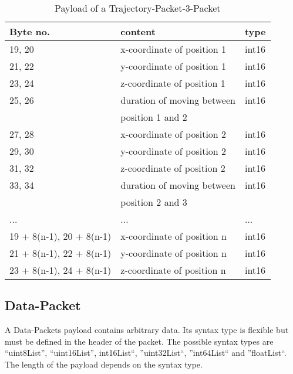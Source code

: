 \begin{table}[htdp]
 \begin{center}
    \begin{tabular}{l|l|l}
      \textbf{Byte no.} & \textbf{content} & \textbf{type} \\
      \hline
      \hline
      19, 20 & x-coordinate of position 1 & int16 \\
      \hline
      21, 22 & y-coordinate of position 1 & int16 \\
      \hline
      23, 24 & z-coordinate of position 1 & int16 \\
      \hline
      25, 26 & duration of moving between & int16\\
      & position 1 and 2 & \\
      \hline
      27, 28 & x-coordinate of position 2 & int16 \\
      \hline
      29, 30 & y-coordinate of position 2 & int16 \\
      \hline
      31, 32 & z-coordinate of position 2 & int16 \\
      \hline
      33, 34 & duration of moving between & int16 \\
      &  position 2 and 3 & \\
      \hline
      ... & ... & ... \\
      \hline
      19 + 8(n-1), 20 + 8(n-1) & x-coordinate of position n & int16 \\
      \hline
      21 + 8(n-1), 22 + 8(n-1) & y-coordinate of position n & int16 \\
      \hline
      23 + 8(n-1), 24 + 8(n-1) & z-coordinate of position n & int16 \\
      \hline
    \end{tabular}
    \caption{Payload of a Trajectory-Packet-3-Packet}
    \label{trajectory_packet_3_payload}
  \end{center}
\end{table}

\subsection{Data-Packet}
\label{subsection:datapacket}

A Data-Packets payload contains arbitrary data. Its syntax type is flexible but must be defined in the header of the packet.
The possible syntax types are ``uint8List'', ``uint16List'', int16List``, ''uint32List``, ''int64List`` and ''floatList``.
The length of the payload depends on the syntax type.
